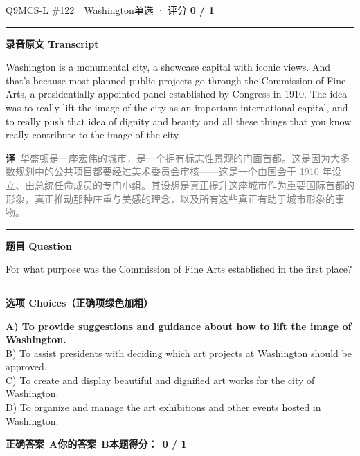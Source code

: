 \documentclass[11pt]{article}
\newcommand{\ptesub}[1]{%
  \par\needspace{2\baselineskip}\smallskip
  {\color{cAccent}\rule[-0.2ex]{3pt}{1.05em}}\hspace{6pt}%
  {\bfseries\color{cHead}#1}\par\nopagebreak\smallskip}
\newcommand{\zh}[1]{{\footnotesize\textcolor{cNote}{\textbf{译}}\ \textcolor{gray}{#1}}}
\begin{document}
\begin{qblock}{Q9\quad MCS-L \#122\ \ Washington}{单选 · 评分 \textcolor{cAccent}{\bfseries 0 / 1}}
\ptesub{录音原文 Transcript}
\begin{promptbox}
Washington is a monumental city, a showcase capital with iconic views. And that's because most planned public projects go through the Commission of Fine Arts, a presidentially appointed panel established by Congress in 1910. The idea was to really lift the image of the city as an important international capital, and to really push that idea of dignity and beauty and all these things that you know really contribute to the image of the city.
\end{promptbox}
\zh{华盛顿是一座宏伟的城市，是一个拥有标志性景观的门面首都。这是因为大多数规划中的公共项目都要经过美术委员会审核——这是一个由国会于 1910 年设立、由总统任命成员的专门小组。其设想是真正提升这座城市作为重要国际首都的形象，真正推动那种庄重与美感的理念，以及所有这些真正有助于城市形象的事物。}
\ptesub{题目 Question}
\begin{notebox}For what purpose was the Commission of Fine Arts established in the first place?\end{notebox}
\ptesub{选项 Choices（正确项绿色加粗）}
{\small
{\color{cFix}\textbf{A) To provide suggestions and guidance about how to lift the image of Washington.}}\\
B) To assist presidents with deciding which art projects at Washington should be approved.\\
C) To create and display beautiful and dignified art works for the city of Washington.\\
D) To organize and manage the art exhibitions and other events hosted in Washington.}
\par\smallskip
\textbf{正确答案}\ \textcolor{cFix}{\bfseries A}\qquad\textbf{你的答案}\ {\color{cWrong}\bfseries B}\qquad\textbf{本题得分：}\ {\color{cAccent}\bfseries 0 / 1}
\end{qblock}
\end{document}
